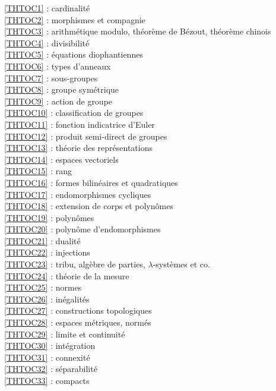 \ref {THTOC1} : cardinalité\\
\ref {THTOC2} : morphismes et compagnie\\
\ref {THTOC3} : arithmétique modulo, théorème de Bézout, théorème chinois\\
\ref {THTOC4} : divisibilité\\
\ref {THTOC5} : équations diophantiennes\\
\ref {THTOC6} : types d'anneaux\\
\ref {THTOC7} : sous-groupes\\
\ref {THTOC8} : groupe symétrique\\
\ref {THTOC9} : action de groupe\\
\ref {THTOC10} : classification de groupes\\
\ref {THTOC11} : fonction indicatrice d'Euler\\
\ref {THTOC12} : produit semi-direct de groupes\\
\ref {THTOC13} : théorie des représentations\\
\ref {THTOC14} : espaces vectoriels\\
\ref {THTOC15} : rang\\
\ref {THTOC16} : formes bilinéaires et quadratiques\\
\ref {THTOC17} : endomorphismes cycliques\\
\ref {THTOC18} : extension de corps et polynômes\\
\ref {THTOC19} : polynômes\\
\ref {THTOC20} : polynôme d'endomorphismes\\
\ref {THTOC21} : dualité\\
\ref {THTOC22} : injections\\
\ref {THTOC23} : tribu, algèbre de parties, \( \lambda \)-systèmes et co.\\
\ref {THTOC24} : théorie de la mesure\\
\ref {THTOC25} : normes\\
\ref {THTOC26} : inégalités\\
\ref {THTOC27} : constructions topologiques\\
\ref {THTOC28} : espaces métriques, normés\\
\ref {THTOC29} : limite et continuité\\
\ref {THTOC30} : intégration\\
\ref {THTOC31} : connexité\\
\ref {THTOC32} : séparabilité\\
\ref {THTOC33} : compacts\\
